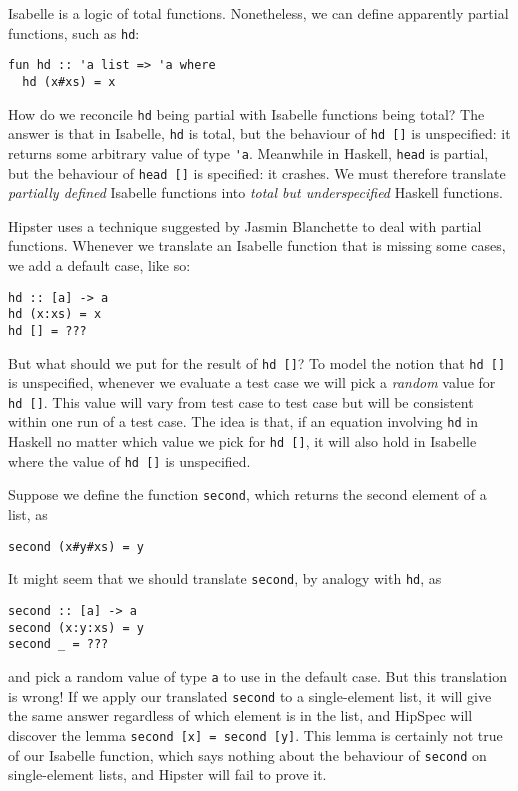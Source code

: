 Isabelle is a logic of total functions. Nonetheless, we can define
apparently partial functions, such as \verb|hd|:
\begin{verbatim}
fun hd :: 'a list => 'a where
  hd (x#xs) = x
\end{verbatim}

How do we reconcile \verb|hd| being partial with Isabelle functions
being total? The answer is that in Isabelle, \verb|hd| is total, but
the behaviour of \verb|hd []| is unspecified: it returns some
arbitrary value of type \verb|'a|. Meanwhile in Haskell, \verb|head|
is partial, but the behaviour of \verb|head []| is specified: it
crashes. We must therefore translate \emph{partially defined} Isabelle
functions into \emph{total but underspecified} Haskell functions.

Hipster uses a technique suggested by Jasmin Blanchette
\cite{blanchettification} to deal with partial functions. Whenever we translate an Isabelle function
that is missing some cases, we add a default case, like so:
\begin{verbatim}
hd :: [a] -> a
hd (x:xs) = x
hd [] = ???
\end{verbatim}

But what should we put for the result of \verb|hd []|? To model the
notion that \verb|hd []| is unspecified, whenever we evaluate a test
case we will pick a \emph{random} value for \verb|hd []|. This value
will vary from test case to test case but will be consistent within
one run of a test case. The idea is that, if an equation involving
\verb|hd| in Haskell no matter which value we pick for \verb|hd []|,
it will also hold in Isabelle where the value of \verb|hd []| is unspecified.

Suppose we define the function \verb|second|, which returns the second
element of a list, as
\begin{verbatim}
second (x#y#xs) = y
\end{verbatim}
It might seem that we should translate \verb|second|, by analogy with \verb|hd|, as
\begin{verbatim}
second :: [a] -> a
second (x:y:xs) = y
second _ = ???
\end{verbatim}
and pick a random value of type \verb|a| to use in the default case.
But this translation is wrong! If we apply our translated \verb|second|
to a single-element list, it will give the same answer regardless of which
element is in the list, and HipSpec will discover the lemma
\verb|second [x] = second [y]|. This lemma is certainly not true of our
Isabelle function, which says nothing about the behaviour
of \verb|second| on single-element lists, and Hipster will fail to
prove it.

